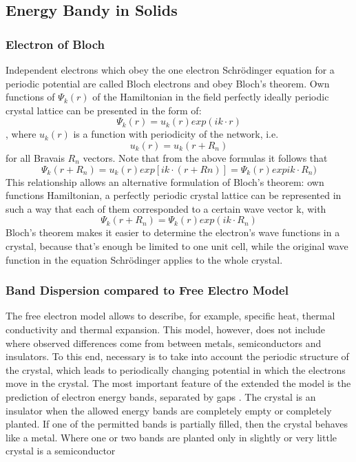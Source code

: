 \subsection{Energy Bandy in Solids} \label{chap2}

\subsubsection*{Electron of Bloch}
Independent electrons which obey the one electron Schrödinger equation for a periodic potential are called Bloch
electrons and obey Bloch’s theorem. Own functions of $\Psi_k(r)$ of the Hamiltonian in the field perfectly ideally periodic crystal lattice can be presented in the form of:
\begin{equation}
\Psi_k(r) = u_k(r)exp(ik \cdot r)
\end{equation}
, where $u_k(r)$ is a function with periodicity of the network, i.e.
\begin{equation}
u_k(r) = u_k(r + R_n)
\end{equation}
for all Bravais $R_n$ vectors. Note that from the above formulas it follows that
$$
\Psi_k(r+R_n) =  u_k(r)exp[ik\cdot(r+Rn)]= \Psi_k(r)expik\cdot R_n)
$$
This relationship allows an alternative formulation of Bloch's theorem: own functions
Hamiltonian, a perfectly periodic crystal lattice can be represented in such a way that each
of them corresponded to a certain wave vector k, with
$$
\Psi_k(r+R_n) = \Psi_k(r)exp(ik \cdot R_n)
$$
Bloch's theorem makes it easier to determine the electron's wave functions in a crystal, because that's enough
be limited to one unit cell, while the original wave function in the equation
Schrödinger applies to the whole crystal.

\subsubsection*{Band Dispersion compared to Free Electro Model}

The free electron model allows to describe, for example,
specific heat, thermal conductivity and thermal expansion. This model, however, does not include where observed differences come from between metals, semiconductors and insulators. To this end, necessary
is to take into account the periodic structure of the crystal, which leads to periodically changing
potential in which the electrons move in the crystal. The most important feature of the extended
the model is the prediction of electron energy bands,
separated by gaps . The crystal is an insulator when the allowed energy bands are completely empty
or completely planted. If one of the permitted bands is partially filled, then
the crystal behaves like a metal. Where one or two bands are planted only in
slightly or very little crystal is a semiconductor


